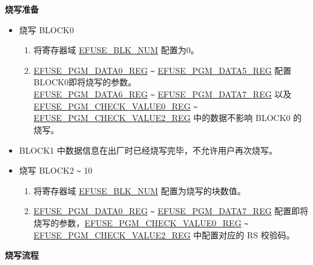 \documentclass[main\_\_CN.tex]{subfiles}
\begin{document}
{\bfseries 烧写准备}

\begin{itemize}
    \item 烧写 BLOCK0
    \begin{enumerate}
        \item 将寄存器域 \hyperref[fielddesc:EFUSEBLKNUM]{EFUSE\_BLK\_NUM} 配置为0。
        \item \hyperref[regdesc:EFUSEPGMDATANREG]{EFUSE\_PGM\_DATA0\_REG} \verb+~+ \hyperref[regdesc:EFUSEPGMDATANREG]{EFUSE\_PGM\_DATA5\_REG} 配置BLOCK0即将烧写的参数。\\
        \hyperref[regdesc:EFUSEPGMDATANREG]{EFUSE\_PGM\_DATA6\_REG} \verb+~+ \hyperref[regdesc:EFUSEPGMDATANREG]{EFUSE\_PGM\_DATA7\_REG} 以及\\ \hyperref[regdesc:EFUSEPGMCHECKVALUENREG]{EFUSE\_PGM\_CHECK\_VALUE0\_REG} \verb+~+ \hyperref[regdesc:EFUSEPGMCHECKVALUENREG]{EFUSE\_PGM\_CHECK\_VALUE2\_REG} 中的数据不影响 BLOCK0 的烧写。
    \end{enumerate}
    \item BLOCK1 中数据信息在出厂时已经烧写完毕，不允许用户再次烧写。

    \item 烧写 BLOCK2 \verb+~+ 10
    \begin{enumerate}
        \item 将寄存器域 \hyperref[fielddesc:EFUSEBLKNUM]{EFUSE\_BLK\_NUM} 配置为烧写的块数值。
        \item \hyperref[regdesc:EFUSEPGMDATANREG]{EFUSE\_PGM\_DATA0\_REG} \verb+~+ \hyperref[regdesc:EFUSEPGMDATANREG]{EFUSE\_PGM\_DATA7\_REG} 配置即将烧写的参数，\hyperref[regdesc:EFUSEPGMCHECKVALUENREG]{EFUSE\_PGM\_CHECK\_VALUE0\_REG}  \verb+~+ \hyperref[regdesc:EFUSEPGMCHECKVALUENREG]{EFUSE\_PGM\_CHECK\_VALUE2\_REG} 中配置对应的 RS 校验码。
    \end{enumerate}
\end{itemize}

{\bfseries 烧写流程}
\end{document}
